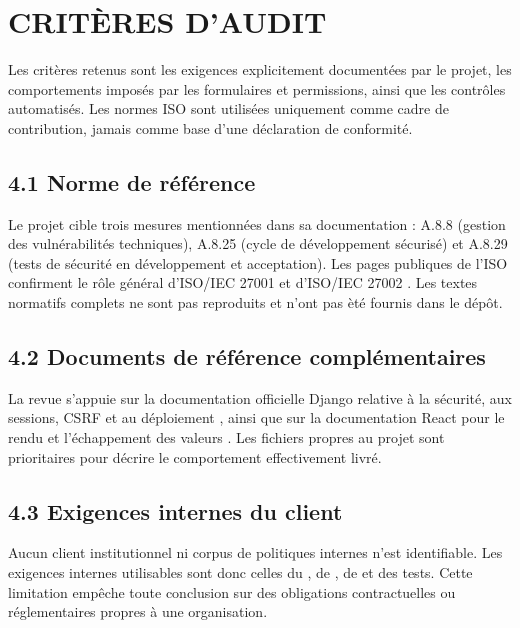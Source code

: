 \chapter{CRIT\`ERES D'AUDIT}

Les crit\`eres retenus sont les exigences explicitement document\'ees par le projet, les comportements impos\'es par les formulaires et permissions, ainsi que les contr\^oles automatis\'es. Les normes ISO sont utilis\'ees uniquement comme cadre de contribution, jamais comme base d'une d\'eclaration de conformit\'e.

\section*{4.1 Norme de r\'ef\'erence}
Le projet cible trois mesures mentionn\'ees dans sa documentation : A.8.8 (gestion des vuln\'erabilit\'es techniques), A.8.25 (cycle de d\'eveloppement s\'ecuris\'e) et A.8.29 (tests de s\'ecurit\'e en d\'eveloppement et acceptation). Les pages publiques de l'ISO confirment le r\^ole g\'en\'eral d'ISO/IEC 27001 et d'ISO/IEC 27002 \cite{iso27001,iso27002}. Les textes normatifs complets ne sont pas reproduits et n'ont pas \`et\'e fournis dans le d\'ep\^ot.

\section*{4.2 Documents de r\'ef\'erence compl\'ementaires}
La revue s'appuie sur la documentation officielle Django relative \`a la s\'ecurit\'e, aux sessions, CSRF et au d\'eploiement \cite{django-security,django-deployment}, ainsi que sur la documentation React pour le rendu et l'\'echappement des valeurs \cite{react-docs}. Les fichiers propres au projet sont prioritaires pour d\'ecrire le comportement effectivement livr\'e.

\section*{4.3 Exigences internes du client}
Aucun client institutionnel ni corpus de politiques internes n'est identifiable. Les exigences internes utilisables sont donc celles du , de , de  et des tests. Cette limitation emp\^eche toute conclusion sur des obligations contractuelles ou r\'eglementaires propres \`a une organisation.

